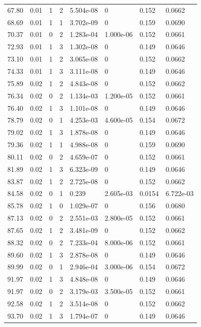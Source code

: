 \documentclass[preview]{standalone}
\begin{document}
{{{\begin{tabular}{L{1.2cm}C{1.2cm} C{0.3cm}C{0.5cm} C{1.4cm}C{1.4cm} C{1.4cm}C{1.4cm}}
  67.80  &  0.01  & 1     &  2 &  5.504e-08  & 0  & 0.152 &  0.0662   \\ 
  68.69  &  0.01  & 1     &  1 &  3.702e-09  & 0  & 0.159 &  0.0690   \\ 
  70.37  &  0.01  & 0     &  2 &  1.283e-04  & 1.000e-06  & 0.152 &  0.0661   \\ 
  72.93  &  0.01  & 1     &  3 &  1.302e-08  & 0  & 0.149 &  0.0646   \\ 
  73.10  &  0.01  & 1     &  2 &  3.065e-08  & 0  & 0.152 &  0.0662   \\ 
  74.33  &  0.01  & 1     &  3 &  3.111e-08  & 0  & 0.149 &  0.0646   \\ 
  75.89  &  0.02  & 1     &  2 &  4.843e-08  & 0  & 0.152 &  0.0662   \\ 
  76.34  &  0.02  & 0     &  2 &  1.134e-03  & 1.200e-05  & 0.152 &  0.0661   \\ 
  76.40  &  0.02  & 1     &  3 &  1.101e-08  & 0  & 0.149 &  0.0646   \\ 
  78.79  &  0.02  & 0     &  1 &  4.253e-03  & 4.600e-05  & 0.154 &  0.0672   \\ 
  79.02  &  0.02  & 1     &  3 &  1.878e-08  & 0  & 0.149 &  0.0646   \\ 
  79.36  &  0.02  & 1     &  1 &  4.988e-08  & 0  & 0.159 &  0.0690   \\ 
  80.11  &  0.02  & 0     &  2 &  4.659e-07  & 0  & 0.152 &  0.0661   \\ 
  81.89  &  0.02  & 1     &  3 &  6.323e-09  & 0  & 0.149 &  0.0646   \\ 
  83.87  &  0.02  & 1     &  2 &  2.725e-08  & 0  & 0.152 &  0.0662   \\ 
  84.58  &  0.02  & 0     &  1 &  0.239  & 2.605e-03  & 0.0154 &  6.722e-03   \\ 
  85.78  &  0.02  & 1     &  0 &  1.029e-07  & 0  & 0.156 &  0.0680   \\ 
  87.13  &  0.02  & 0     &  2 &  2.551e-03  & 2.800e-05  & 0.152 &  0.0661   \\ 
  87.65  &  0.02  & 1     &  2 &  3.481e-09  & 0  & 0.152 &  0.0662   \\ 
  88.32  &  0.02  & 0     &  2 &  7.233e-04  & 8.000e-06  & 0.152 &  0.0661   \\ 
  89.60  &  0.02  & 1     &  3 &  2.878e-08  & 0  & 0.149 &  0.0646   \\ 
  89.99  &  0.02  & 0     &  1 &  2.946e-04  & 3.000e-06  & 0.154 &  0.0672   \\ 
  91.97  &  0.02  & 1     &  3 &  4.848e-08  & 0  & 0.149 &  0.0646   \\ 
  91.97  &  0.02  & 0     &  2 &  3.179e-03  & 3.500e-05  & 0.152 &  0.0661   \\ 
  92.58  &  0.02  & 1     &  2 &  3.514e-08  & 0  & 0.152 &  0.0662   \\ 
  93.70  &  0.02  & 1     &  3 &  1.794e-07  & 0  & 0.149 &  0.0646   \\ 
\hline 
\end{tabular} 

}}}
\end{document}
